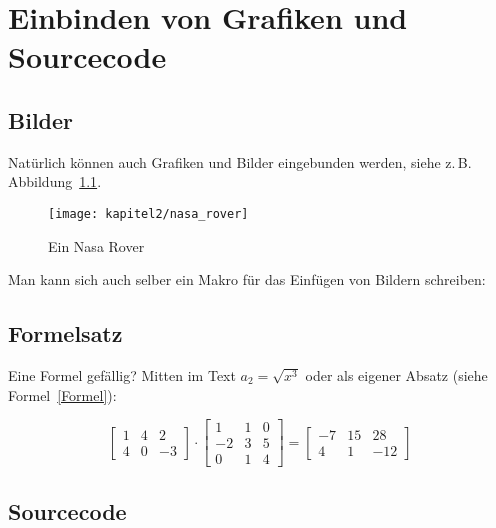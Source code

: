 \chapter{Einbinden von Grafiken und Sourcecode}
\label{Kap2}

\section{Bilder}

Natürlich können auch Grafiken und Bilder eingebunden werden, siehe z.\,B. Abbildung~\ref{Kap2:NasaRover}.

\begin{figure}[h]
  \centering
  \texttt{[image: kapitel2/nasa\_rover]}
  \caption{Ein Nasa Rover}
  \label{Kap2:NasaRover}
\end{figure}


Man kann sich auch selber ein Makro für das Einfügen von Bildern schreiben:



\clearpage %



\section{Formelsatz}

Eine Formel gefällig? Mitten im Text $a_2 = \sqrt{x^3}$ oder als eigener Absatz (siehe Formel~\ref{Formel}):

\begin{equation}
\begin{bmatrix}         
   1 &  4 &  2 \\
   4 &  0 & -3 
\end{bmatrix}        
        \cdot
\begin{bmatrix}                
   1 &  1 &  0 \\
  -2 &  3 &  5 \\
   0 &  1 &  4 
\end{bmatrix}        
       {=} 
\begin{bmatrix}               
  -7 &  15 &  28 \\
   4 &   1 & -12 
\end{bmatrix}
\label{Formel}
\end{equation}


\section{Sourcecode}

